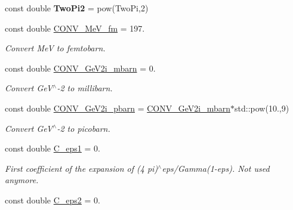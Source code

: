 \begin{DoxyCompactItemize}
\item 
\hypertarget{namespaceConstants_a2b59b5bfa81e4c4856decced98ea335c}{const double {\bfseries Two\-Pi2} = pow(Two\-Pi,2)}\label{namespaceConstants_a2b59b5bfa81e4c4856decced98ea335c}

\item 
\hypertarget{namespaceConstants_a87e93458211f4439996b0180c224dc9b}{const double \hyperlink{namespaceConstants_a87e93458211f4439996b0180c224dc9b}{C\-O\-N\-V\-\_\-\-Me\-V\-\_\-fm} = 197.}\label{namespaceConstants_a87e93458211f4439996b0180c224dc9b}

\begin{DoxyCompactList}\small\item\em Convert Me\-V to femtobarn. \end{DoxyCompactList}\item 
\hypertarget{namespaceConstants_a34a29f9238234188581f6a80cbe9f93d}{const double \hyperlink{namespaceConstants_a34a29f9238234188581f6a80cbe9f93d}{C\-O\-N\-V\-\_\-\-Ge\-V2i\-\_\-mbarn} = 0.}\label{namespaceConstants_a34a29f9238234188581f6a80cbe9f93d}

\begin{DoxyCompactList}\small\item\em Convert Ge\-V$^\wedge$-\/2 to millibarn. \end{DoxyCompactList}\item 
\hypertarget{namespaceConstants_afebddfeaa678e68660119f3535b159b0}{const double \hyperlink{namespaceConstants_afebddfeaa678e68660119f3535b159b0}{C\-O\-N\-V\-\_\-\-Ge\-V2i\-\_\-pbarn} = \hyperlink{namespaceConstants_a34a29f9238234188581f6a80cbe9f93d}{C\-O\-N\-V\-\_\-\-Ge\-V2i\-\_\-mbarn}$\ast$std\-::pow(10.,9)}\label{namespaceConstants_afebddfeaa678e68660119f3535b159b0}

\begin{DoxyCompactList}\small\item\em Convert Ge\-V$^\wedge$-\/2 to picobarn. \end{DoxyCompactList}\item 
\hypertarget{namespaceConstants_ad6cbf9275cfd499e91ea8a36413e8710}{const double \hyperlink{namespaceConstants_ad6cbf9275cfd499e91ea8a36413e8710}{C\-\_\-eps1} = 0.}\label{namespaceConstants_ad6cbf9275cfd499e91ea8a36413e8710}

\begin{DoxyCompactList}\small\item\em First coefficient of the expansion of (4 pi)$^\wedge$eps/\-Gamma(1-\/eps). Not used anymore. \end{DoxyCompactList}\item 
\hypertarget{namespaceConstants_a7b274ecbfd01a275f44238a5bc1bd12e}{const double \hyperlink{namespaceConstants_a7b274ecbfd01a275f44238a5bc1bd12e}{C\-\_\-eps2} = 0.}\label{namespaceConstants_a7b274ecbfd01a275f44238a5bc1bd12e}


\end{DoxyCompactItemize}
